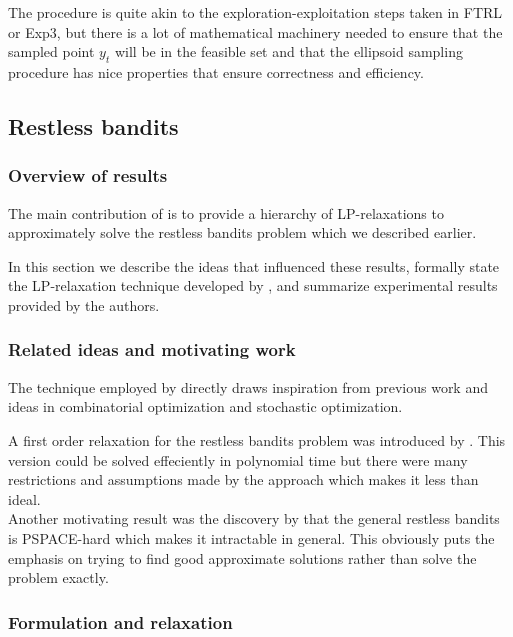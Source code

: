 The procedure is quite akin to the exploration-exploitation steps taken in FTRL or Exp3, but there is a lot of mathematical machinery needed to ensure that the sampled point $y_t$ will be in the feasible set and that the ellipsoid sampling procedure has nice properties that ensure correctness and efficiency. 



\subsection{Restless bandits}

\subsubsection{Overview of results}
The main contribution of \citep{bertsimas} is to provide a hierarchy of LP-relaxations
to approximately solve the restless bandits problem which we described earlier.

In this section we describe the ideas that influenced these results, formally state the LP-relaxation technique developed by \citep{bertsimas}, and  summarize experimental results provided by the authors.

\subsubsection{Related ideas and motivating work}
The technique employed by \citep{bertsimas} directly draws inspiration from previous work and ideas in combinatorial optimization and stochastic optimization. 

A first order relaxation for the restless bandits problem was introduced by \citep{whittle}. This version could be solved effeciently in polynomial time but there were many restrictions and assumptions made by the approach which makes it less than ideal.\\

Another motivating result was the discovery  by \citep{papad}that the general restless bandits is PSPACE-hard which makes it intractable in general. This obviously puts the emphasis on trying to find good approximate solutions rather than solve the problem exactly. \\ 

\subsubsection{Formulation and relaxation}

